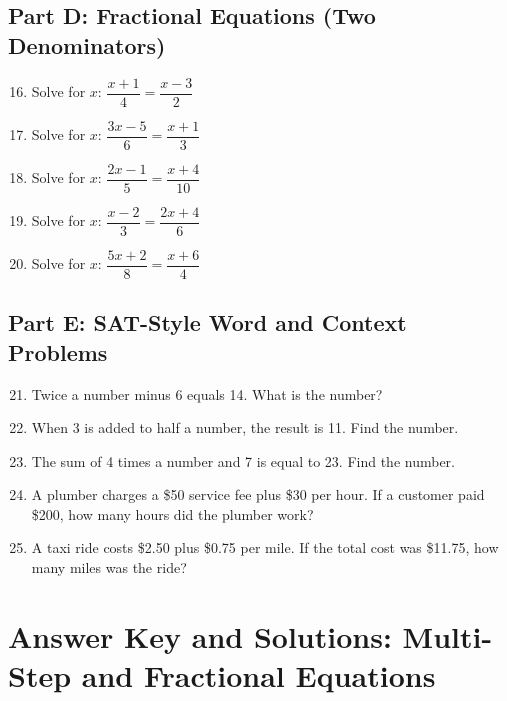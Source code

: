 \documentclass[14pt]{extarticle}
\begin{document}
\subsection*{Part D: Fractional Equations (Two Denominators)}
\begin{enumerate}
    \setcounter{enumi}{15}
    \item Solve for \(x\): \(\dfrac{x + 1}{4} = \dfrac{x - 3}{2}\)
    \item Solve for \(x\): \(\dfrac{3x - 5}{6} = \dfrac{x + 1}{3}\)
    \item Solve for \(x\): \(\dfrac{2x - 1}{5} = \dfrac{x + 4}{10}\)
    \item Solve for \(x\): \(\dfrac{x - 2}{3} = \dfrac{2x + 4}{6}\)
    \item Solve for \(x\): \(\dfrac{5x + 2}{8} = \dfrac{x + 6}{4}\)
\end{enumerate}

\subsection*{Part E: SAT-Style Word and Context Problems}
\begin{enumerate}
    \setcounter{enumi}{20}
    \item Twice a number minus 6 equals 14. What is the number?
    \item When 3 is added to half a number, the result is 11. Find the number.
    \item The sum of 4 times a number and 7 is equal to 23. Find the number.
    \item A plumber charges a \$50 service fee plus \$30 per hour. If a customer paid \$200, how many hours did the plumber work?
    \item A taxi ride costs \$2.50 plus \$0.75 per mile. If the total cost was \$11.75, how many miles was the ride?
\end{enumerate}
\newpage


\section*{Answer Key and Solutions: Multi-Step and Fractional Equations}
\end{document}
